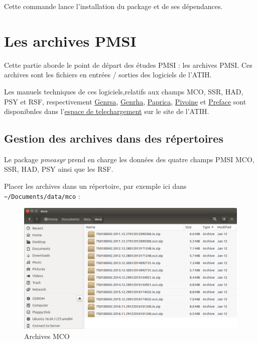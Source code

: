 \documentclass[]{book}
\begin{document}
Cette commande lance l'installation du package et de ses dépendances.

\chapter{Les archives PMSI}\label{archives}

Cette partie aborde le point de départ des études PMSI : les archives
PMSI. Ces archives sont les fichiers en entrées / sorties des logiciels
de l'ATIH.

Les manuels techniques de ces logiciels,relatifs aux champs MCO, SSR,
HAD, PSY et RSF, respectivement
\href{http://atih.sante.fr/plateformes-de-transmission-et-logiciels/logiciels-espace-de-telechargement\#G}{Genrsa},
\href{http://atih.sante.fr/plateformes-de-transmission-et-logiciels/logiciels-espace-de-telechargement\#G}{Genrha},
\href{http://atih.sante.fr/plateformes-de-transmission-et-logiciels/logiciels-espace-de-telechargement\#P}{Paprica},
\href{http://atih.sante.fr/plateformes-de-transmission-et-logiciels/logiciels-espace-de-telechargement\#P}{Pivoine}
et
\href{http://atih.sante.fr/plateformes-de-transmission-et-logiciels/logiciels-espace-de-telechargement\#P}{Preface}
sont disponibnles dans
l'\href{http://atih.sante.fr/plateformes-de-transmission-et-logiciels/logiciels-espace-de-telechargement}{espace
de telechargement} sur le site de l'ATIH.

\section{Gestion des archives dans des
répertoires}\label{gestion-des-archives-dans-des-repertoires}

Le package \emph{pmeasyr} prend en charge les données des quatre champs
PMSI MCO, SSR, HAD, PSY ainsi que les RSF.

Placer les archives dans un répertoire, par exemple ici dans
\texttt{\textasciitilde{}/Documents/data/mco} :

\begin{figure}[htbp]
\centering
\includegraphics{images/archives_mco.png}
\caption{Archives MCO}
\end{figure}
\end{document}
